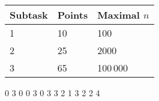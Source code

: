 
\begin{center}
\begin{tabular}{|l|l|l|}
\hline
Subtask & Points & Maximal $n$  \\ \hline
1       & 10     & 100           \\ \hline
2       & 25     & 2000         \\ \hline
3       & 65     & 100\,000       \\ \hline
\end{tabular}
\end{center}



0 3
0 0
3 0
3 3
2
1 3
2
2 4
\sampleCOMMENT
\sampleEND




